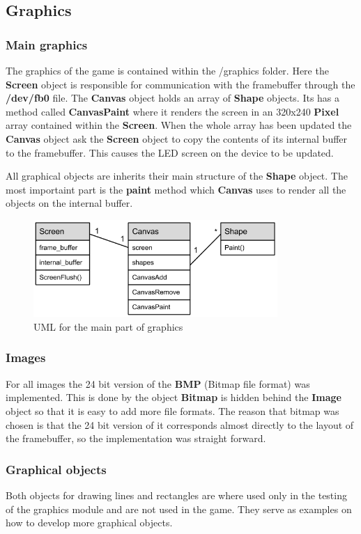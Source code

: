 \subsection{Graphics}

\subsubsection{Main graphics}
The graphics of the game is contained within the /graphics folder. Here the {\bf Screen} object
is responsible for communication with the framebuffer through the {\bf /dev/fb0} file. The
{\bf Canvas} object holds an array of {\bf Shape} objects. Its has a method called {\bf CanvasPaint}
where it renders the screen in an 320x240 {\bf Pixel} array contained within the {\bf Screen}. When
the whole array has been updated the {\bf Canvas} object ask the {\bf Screen} object to copy the
contents of its internal buffer to the framebuffer. This causes the LED screen on the device to be
updated.

All graphical objects are inherits their main structure of the {\bf Shape} object. The most importaint
part is the {\bf paint} method which {\bf Canvas} uses to render all the objects on the internal buffer.

\begin{figure}[h]
  \includegraphics[width=350px]{graphics/graphics_UML.png}
  \caption{UML for the main part of graphics}
\end{figure}

\subsubsection{Images}
For all images the 24 bit version of the {\bf BMP} (Bitmap file format) was implemented. This is
done by the object {\bf Bitmap} is hidden behind the {\bf Image} object so that it is easy to add
more file formats. The reason that bitmap was chosen is that the 24 bit version of it corresponds
almost directly to the layout of the framebuffer, so the implementation was straight forward.

\subsubsection{Graphical objects}
Both objects for drawing lines and rectangles are where used only in the testing of the graphics module
and are not used in the game. They serve as examples on how to develop more graphical objects.
